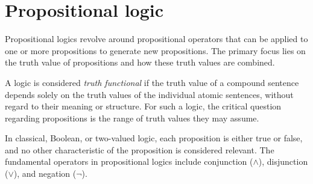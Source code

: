\section{Propositional logic}

Propositional logics revolve around propositional operators that can be applied to one or more propositions to generate new propositions. 
The primary focus lies on the truth value of propositions and how these truth values are combined.
\begin{definition}
    A logic is considered \emph{truth functional} if the truth value of a compound sentence depends solely on the truth values of the individual atomic sentences, without regard to their meaning or structure. 
    For such a logic, the critical question regarding propositions is the range of truth values they may assume.
\end{definition}
In classical, Boolean, or two-valued logic, each proposition is either true or false, and no other characteristic of the proposition is considered relevant.
The fundamental operators in propositional logics include conjunction ($\land$), disjunction ($\lor$), and negation ($\lnot$).